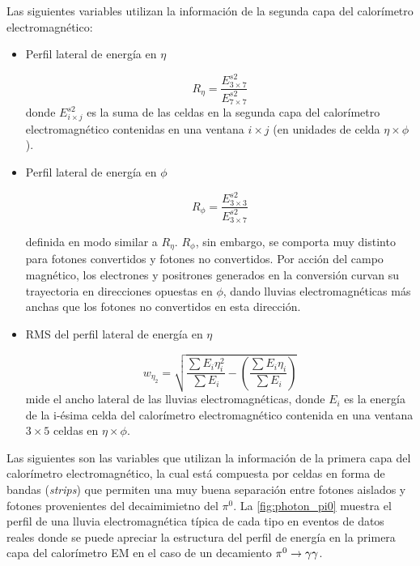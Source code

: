 Las siguientes variables utilizan la información de la segunda capa del calorímetro
electromagnético:

\begin{itemize}\itemsep0.2cm\parskip0.2cm
\item Perfil lateral de energía en $\eta$

  \begin{equation}
    R_\eta = \frac{E^{s2}_{3\times 7}}{E^{s2}_{7\times 7}}
  \end{equation}
%
  donde $E^{s2}_{i\times j}$ es la suma de las celdas en la segunda capa del calorímetro
  electromagnético contenidas en una ventana $i \times j$ (en unidades de celda $\eta \times \phi$).

\item Perfil lateral de energía en $\phi$

  \begin{equation}
    R_\phi = \frac{E^{s2}_{3\times 3}}{E^{s2}_{3\times 7}}
  \end{equation}

  definida en modo similar a $R_\eta$.
  $R_\phi$, sin embargo, se comporta muy distinto para fotones convertidos y
  fotones no convertidos. Por acción del campo magnético, los electrones y positrones
  generados en la conversión curvan su trayectoria en direcciones opuestas en $\phi$,
  dando lluvias electromagnéticas más anchas que los fotones no convertidos en esta dirección.


  \item RMS del perfil lateral de energía en $\eta$

  \begin{equation}
    w_{\eta_2} = \sqrt{ \frac{\sum E_i \eta_i^2}{\sum E_i} - \left( \frac{\sum E_i \eta_i}{\sum E_i} \right) }
  \end{equation}
  mide el ancho lateral de las lluvias electromagnéticas, donde $E_i$ es la energía de la i-ésima celda del
  calorímetro electromagnético contenida en una ventana $3 \times 5$ celdas en $\eta \times \phi$.
\end{itemize}

Las siguientes son las variables que utilizan la información de la primera capa
del calorímetro electromagnético, la cual está compuesta por celdas en forma de
bandas (\emph{strips}) que permiten una muy buena separación entre fotones aislados y
fotones provenientes del decaimimietno del $\pi^0$. La \cref{fig:photon_pi0}
muestra el perfil de una lluvia electromagnética típica de cada tipo en eventos
de datos reales donde se puede apreciar la estructura del perfil de energía en
la primera capa del calorímetro EM en el caso de un decamiento $\pi^0 \to \gam\gam$.


